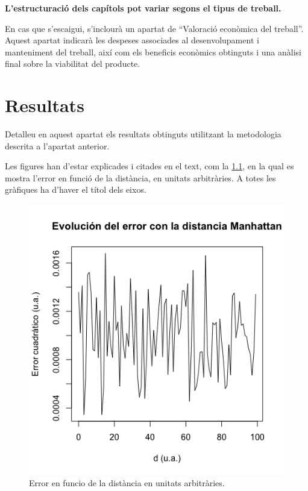 \documentclass[CAT]{TFUOC}%
\begin{document}
 
\textbf{L’estructuració dels capítols pot variar segons el tipus de treball.}  
 
En cas que s’escaigui, s’inclourà un apartat de “Valoració econòmica del treball”. Aquest apartat indicarà les despeses associades al desenvolupament i manteniment del treball, així com els beneficis econòmics obtinguts i una anàlisi final sobre la viabilitat del producte.



\chapter{Resultats}

Detalleu en aquest apartat els resultats obtinguts utilitzant la metodologia descrita a l’apartat anterior.



Les figures han d'estar explicades i citades en el text, com la \ref{fig:my_label}, en la qual es mostra l'error en funció de la distància, en unitats arbitràries. A totes les gràfiques ha d'haver el títol dels eixos.

\begin{figure}[!htbp]
    \centering
    \includegraphics[width=7truecm]{Rplotmanh.png}
    \caption{Error en funcio de la distància en unitats arbitràries.}
    \label{fig:my_label}
\end{figure}
\end{document}
